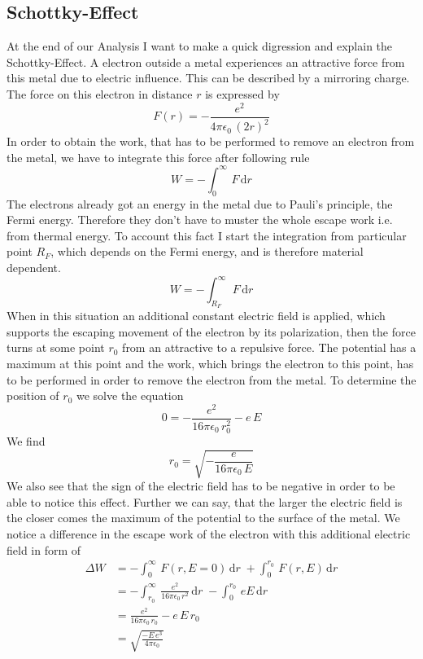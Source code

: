 \documentclass[a4paper, 12pt]{scrartcl}
\begin{document}
\subsection{Schottky-Effect}
At the end of our Analysis I want to make a quick digression and explain the Schottky-Effect. A electron outside a metal experiences an attractive force from this metal due to electric influence. This can be described by a mirroring charge. The force on this electron in distance $r$ is expressed by
\begin{equation*}F(r)=-\frac{e^2}{4\pi\epsilon_0\,(2r)^2}\end{equation*}
In order to obtain the work, that has to be performed to remove an electron from the metal, we have to integrate this force after following rule
\begin{equation*}W=-\int_{0}^\infty\,F\,\text{d}r\end{equation*}
The electrons already got an energy in the metal due to Pauli's principle, the Fermi energy. Therefore they don't have to muster the whole escape work i.e. from thermal energy. To account this fact I start the integration from particular point $R_F$, which depends on the Fermi energy, and is therefore material dependent.
\begin{equation*}W=-\int_{R_F}^\infty\,F\,\text{d}r\end{equation*}
When in this situation an additional constant electric field is applied, which supports the escaping movement of the electron by its polarization, then the force turns at some point $r_0$ from an attractive to a repulsive force. The potential has a maximum at this point and the work, which brings the electron to this point, has to be performed in order to remove the electron from the metal. To determine the position of $r_0$ we solve the equation
\begin{equation*}0=-\frac{e^2}{16\pi\epsilon_0\,r_0^2}-e\,E\end{equation*}
We find
\begin{equation*}r_0=\sqrt{-\frac{e}{16\pi\epsilon_0\,E}}\end{equation*}
We also see that the sign of the electric field has to be negative in order to be able to notice this effect. Further we can say, that the larger the electric field is the closer comes the maximum of the potential to the surface of the metal. We notice a difference in the escape work of the electron with this additional electric field in form of
\begin{align*}\Delta{W}&=-\int_0^\infty\,F\left(r,E=0\right)\,\text{d}r\;+\int_0^{r_0}\,F(r,E)\,\text{d}r\\
&=-\int_{r_0}^\infty\,\frac{e^2}{16\pi\epsilon_0\,r^2}\,\text{d}r\;-\int_0^{r_0}\,eE\,\text{d}r\\
&=\frac{e^2}{16\pi\epsilon_0\,r_0}-e\,E\,r_0\\
&=\sqrt{\frac{-E\,e^3}{4\pi\epsilon_0}}\end{align*}
\end{document}
